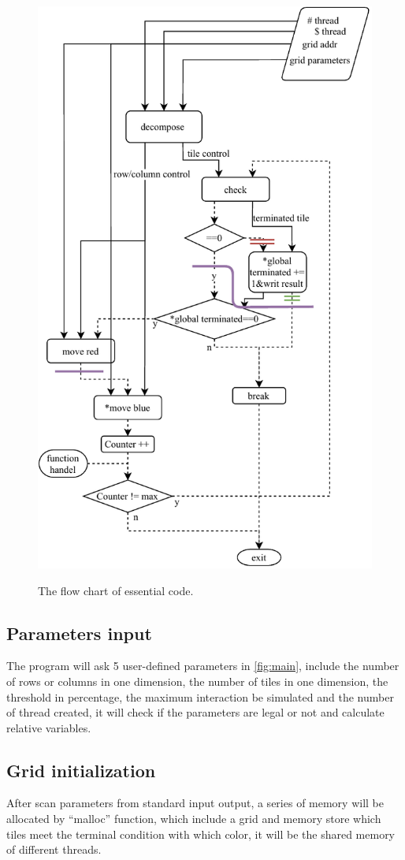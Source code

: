 \documentclass[12pt]{article}
\begin{document}
\begin{figure}[ht]
    [0.48\textwidth]{\includegraphics[width=0.9\linewidth]{workload.pdf}}
    \caption{The flow chart of essential code.}
    \label{fig:flowchart}
\end{figure}
\subsection{Parameters input}
The program will ask 5 user-defined parameters in \autoref{fig:main}, include the number of rows or columns in one dimension, the number of tiles in one dimension, the threshold in percentage, the maximum interaction be simulated and the number of thread created, it will check if the parameters are legal or not and calculate relative variables.
\subsection{Grid initialization}
After scan parameters from standard input output, a series of memory will be allocated by “malloc” function, which include a grid and memory store which tiles meet the terminal condition with which color, it will be the shared memory of different threads.
\end{document}
